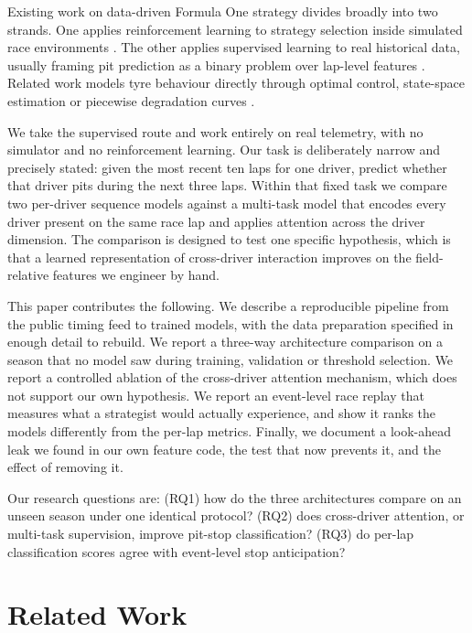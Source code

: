 \documentclass[conference]{IEEEtran}
\begin{document}
Existing work on data-driven Formula One strategy divides broadly into two strands. One applies reinforcement learning to strategy selection inside simulated race environments \cite{thomas2025explainable,veerasagar2025optimum,mendez2025pitstop}. The other applies supervised learning to real historical data, usually framing pit prediction as a binary problem over lap-level features \cite{sasikumar2025pit,fatima2023deepracing,ametsbichler2025gbm}. Related work models tyre behaviour directly through optimal control, state-space estimation or piecewise degradation curves \cite{tremlett2016tyre,cappello2026statespace,rohan2026piecewise}.

We take the supervised route and work entirely on real telemetry, with no simulator and no reinforcement learning. Our task is deliberately narrow and precisely stated: given the most recent ten laps for one driver, predict whether that driver pits during the next three laps. Within that fixed task we compare two per-driver sequence models against a multi-task model that encodes every driver present on the same race lap and applies attention across the driver dimension. The comparison is designed to test one specific hypothesis, which is that a learned representation of cross-driver interaction improves on the field-relative features we engineer by hand.

This paper contributes the following. We describe a reproducible pipeline from the public timing feed to trained models, with the data preparation specified in enough detail to rebuild. We report a three-way architecture comparison on a season that no model saw during training, validation or threshold selection. We report a controlled ablation of the cross-driver attention mechanism, which does not support our own hypothesis. We report an event-level race replay that measures what a strategist would actually experience, and show it ranks the models differently from the per-lap metrics. Finally, we document a look-ahead leak we found in our own feature code, the test that now prevents it, and the effect of removing it.

Our research questions are: (RQ1) how do the three architectures compare on an unseen season under one identical protocol? (RQ2) does cross-driver attention, or multi-task supervision, improve pit-stop classification? (RQ3) do per-lap classification scores agree with event-level stop anticipation?

\section{Related Work}
\end{document}
